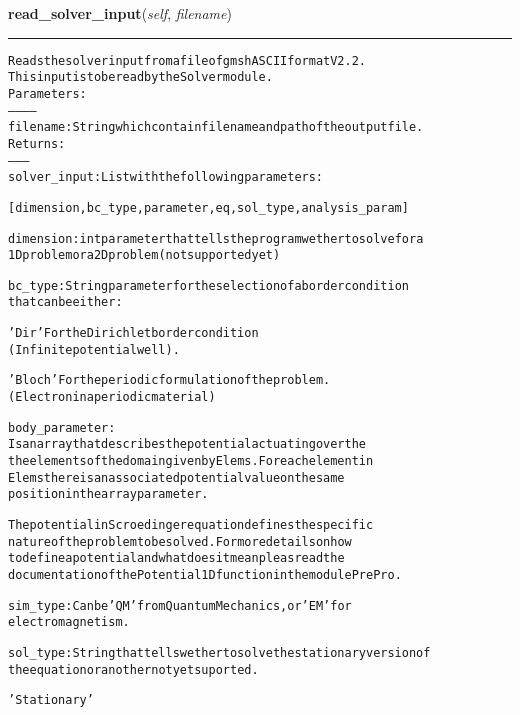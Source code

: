 \hspace{.8\funcindent}\begin{boxedminipage}{\funcwidth}

    \raggedright \textbf{read\_solver\_input}(\textit{self}, \textit{filename})

    \vspace{-1.5ex}

    \rule{\textwidth}{0.5\fboxrule}
\setlength{\parskip}{2ex}
\begin{alltt}

Reads the solver input from a file of gmsh ASCII format V2.2.
This input is to be read by the Solver module.
Parameters:
-----------
filename: String which contain filename and path of the output file.
Returns:
--------
solver\_input: List with the following parameters:

[dimension,bc\_type,parameter,eq,sol\_type,analysis\_param]

dimension:  int parameter that tells the program wether to solve for a
        1D problem or a 2D problem (not supported yet)

bc\_type:     String parameter for the selection of a border condition
            that can be either:

                'Dir'   For the Dirichlet border condition
                        (Infinite potential well).

                'Bloch' For the periodic formulation of the problem.
                        (Electron in a periodic material )
        
body\_parameter:  
        Is an array that describes the potential actuating over the
        the elements of the domain given by Elems. For each element in
        Elems there is an associated potential value on the same
        position in the array parameter.

        The potential in Scroedinger equation defines the specific
        nature of the problem to be solved. For more details on how
        to define a potential and what does it mean pleas read the
        documentation of the Potential1D function in the module PrePro.


sim\_type: Can be 'QM' from Quantum Mechanics, or 'EM' for 
          electromagnetism.


sol\_type:       String that tells wether to solve the stationary version of
            the equation or another not yet suported.

            'Stationary'   


\end{alltt}
\end{boxedminipage}
